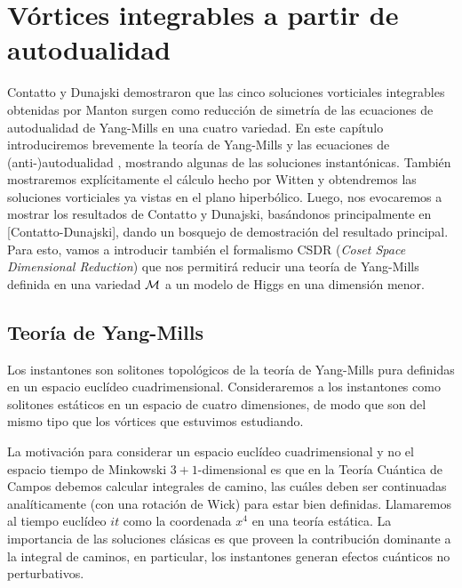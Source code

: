 
\chapter{Vórtices integrables a partir de autodualidad} %

\label{ch:selfduality} %


Contatto y Dunajski demostraron que las cinco soluciones vorticiales integrables obtenidas por Manton surgen como reducción de simetría de las ecuaciones de autodualidad de Yang-Mills en una cuatro variedad. En este capítulo introduciremos brevemente la teoría de Yang-Mills y las ecuaciones de (anti-)autodualidad , mostrando algunas de las soluciones instantónicas. También mostraremos explícitamente el cálculo hecho por Witten y obtendremos las soluciones vorticiales ya vistas en el plano hiperbólico. Luego, nos evocaremos a mostrar los resultados de Contatto y Dunajski, basándonos principalmente en [Contatto-Dunajski], dando un bosquejo de demostración del resultado principal. Para esto, vamos a introducir también el formalismo CSDR (\emph{Coset Space Dimensional Reduction}) que nos permitirá reducir una teoría de Yang-Mills definida en una variedad $\mathcal{M}$ a un modelo de Higgs en una dimensión menor.

\section{Teoría de Yang-Mills}\label{sec:4.1}

Los instantones son solitones topológicos de la teoría de Yang-Mills pura definidas en un espacio euclídeo cuadrimensional. Consideraremos a los instantones como solitones estáticos en un espacio de cuatro dimensiones, de modo que son del mismo tipo que los vórtices que estuvimos estudiando.

La motivación para considerar un espacio euclídeo cuadrimensional y no el espacio tiempo de Minkowski $3+1$-dimensional es que en la Teoría Cuántica de Campos debemos calcular integrales de camino, las cuáles deben ser continuadas analíticamente (con una rotación de Wick) para estar bien definidas. Llamaremos al tiempo euclídeo $it$ como la coordenada $x^4$ en una teoría estática. La importancia de las soluciones clásicas es que proveen la contribución dominante a la integral de caminos, en particular, los instantones generan efectos cuánticos no perturbativos.

